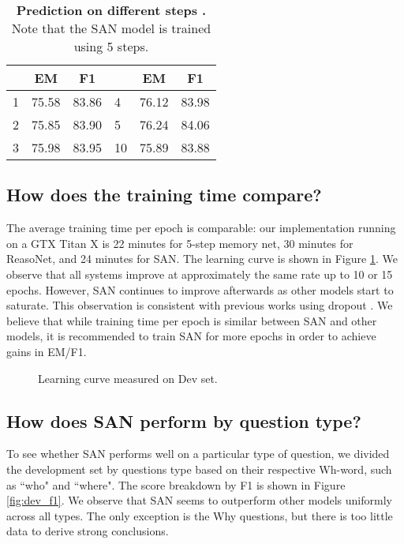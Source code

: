 \documentclass[11pt,a4paper]{article}
\begin{document}
\begin{table}[t!]
\centering
\begin{tabular}{@{\hskip1pt} l ||@{\hskip1pt} c |@{\hskip1pt} c |@{\hskip1pt} l |@{\hskip1pt} c |@{\hskip1pt} c}
\hline
	&EM&F1 &	&EM&F1\\ \hline\hline
1 &75.58 &83.86 &4 &76.12 &83.98\\ \hline
2 &75.85 &83.90 &5 &76.24 &84.06 \\ \hline
3 &75.98 &83.95 &10 &75.89 &83.88 \\ \hline
\end{tabular}
\caption{\label{tab:comp_pre_step} 
\textbf{Prediction on different steps .} Note that the SAN model is trained using 5 steps.} 
\end{table}

\subsection{How does the training time compare?}
The average training time per epoch is comparable: our implementation running on a GTX Titan X
is 22 minutes for 5-step memory net, 30 minutes for ReasoNet, and 24 minutes for SAN. 
The learning curve is shown in Figure \ref{fig:dev_curve}.
We observe that all systems improve at approximately the same rate up to 10 or 15 epochs. 
However, SAN continues to improve afterwards as other models start to saturate. 
This observation is consistent with previous works using dropout \cite{srivastava2014dropout}. 
We believe that while training time per epoch is similar between SAN and other models, it is recommended to train SAN for more epochs in order to achieve gains in EM/F1. 

\begin{figure}[t!]
\centering  
{}
\caption{\label{fig:dev_curve} Learning curve measured on Dev set.}
\end{figure}

\subsection{How does SAN perform by question type?}
To see whether SAN performs well on a particular type of question, we divided the development set by questions type based on their respective Wh-word, such as ``who" and ``where". 
The score breakdown by F1 is shown in Figure \ref{fig:dev_f1}. 
We observe that SAN seems to outperform other models uniformly across all types. 
The only exception is the Why questions, but there is too little data to derive strong conclusions. 
\end{document}
